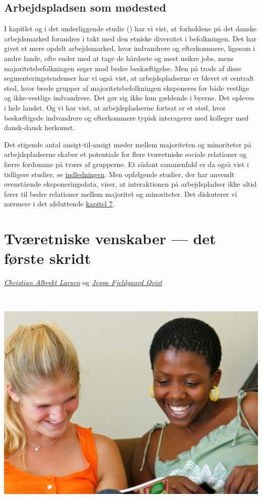 \documentclass[
]{book}
\begin{document}
\section{Arbejdspladsen som mødested}\label{arbejdspladsen-som-muxf8dested}

I kapitlet og i det underliggende studie () har vi vist, at forholdene på det danske arbejdsmarked forandres i takt med den etniske diversitet i befolkningen. Det har givet et mere opdelt arbejdsmarked, hvor indvandrere og efterkommere, ligesom i andre lande, ofte ender med at tage de hårdeste og mest usikre jobs, mens majoritetsbefolkningen søger mod bedre beskæftigelse. Men på trods af disse segmenteringstendenser har vi også vist, at arbejdspladserne er blevet et centralt sted, hvor brede grupper af majoritetsbefolkningen eksponeres for både vestlige og ikke-vestlige indvandrere. Det gør sig ikke kun gældende i byerne. Det opleves i hele landet. Og vi har vist, at arbejdspladserne fortsat er et sted, hvor beskæftigede indvandrere og efterkommere typisk interagerer med kolleger med dansk-dansk herkomst.

Det stigende antal ansigt-til-ansigt møder mellem majoriteten og minoriteter på arbejdspladserne skaber et potentiale for flere tværetniske sociale relationer og færre fordomme på tværs af grupperne. Et sådant sammenfald er da også vist i tidligere studier, se \hyperref[indledning]{indledningen}. Men opfølgende studier, der har anvendt ovenstående eksponeringsdata, viser, at interaktionen på arbejdspladser ikke altid fører til bedre relationer mellem majoritet og minoriteter. Det diskuterer vi nærmere i det afsluttende \hyperref[kap7]{kapitel 7}.

\chapter{Tværetniske venskaber --- det første skridt}\label{kap6}

\emph{\href{https://vbn.aau.dk/en/persons/albrekt}{Christian Albrekt Larsen}} og \emph{\href{https://vbn.aau.dk/da/persons/jeppefl}{Jeppe Fjeldgaard Qvist}}

~~~~

\includegraphics[width=1\linewidth]{images/kap71}
\end{document}
